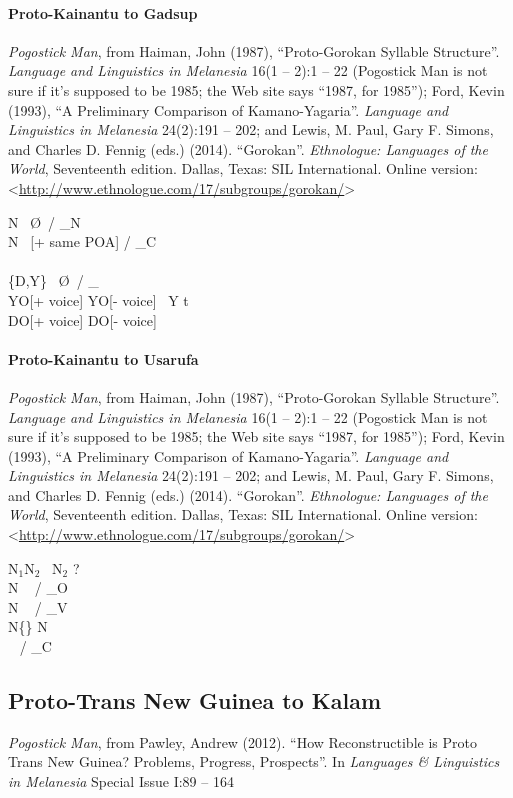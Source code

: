 \documentclass[11pt]{article}
\newcommand{\ipa}{\textipa}
\newcommand{\change}{\textrightarrow}
\begin{document}
\paragraph{Proto-Kainantu to Gadsup}{\it Pogostick Man}, from Haiman, John (1987), ``Proto-Gorokan Syllable Structure''. {\it Language and Linguistics in Melanesia} 16(1 -- 2):1 -- 22 (Pogostick Man is not sure if it's supposed to be 1985; the Web site says ``1987, for 1985''); Ford, Kevin (1993), ``A Preliminary Comparison of Kamano-Yagaria''. {\it Language and Linguistics in Melanesia} 24(2):191 -- 202; and Lewis, M. Paul, Gary F. Simons, and Charles D. Fennig (eds.) (2014). ``Gorokan''. {\it Ethnologue: Languages of the World}, Seventeenth edition. Dallas, Texas: SIL International. Online version: \textless\url{http://www.ethnologue.com/17/subgroups/gorokan/}\textgreater

N \change\ \O\ / _N\\
N \change\ [+ same POA] / _C\\
\ipa{nw nr} \change\ \ipa{mb nd}\\
\{D,Y\} \change\ \O\ / _\ipa{n}\\
YO[+ voice] YO[- voice] \change\ Y t\\
DO[+ voice] DO[- voice] \change\ \ipa{nd nt}

\paragraph{Proto-Kainantu to Usarufa}{\it Pogostick Man}, from Haiman, John (1987), ``Proto-Gorokan Syllable Structure''. {\it Language and Linguistics in Melanesia} 16(1 -- 2):1 -- 22 (Pogostick Man is not sure if it's supposed to be 1985; the Web site says ``1987, for 1985''); Ford, Kevin (1993), ``A Preliminary Comparison of Kamano-Yagaria''. {\it Language and Linguistics in Melanesia} 24(2):191 -- 202; and Lewis, M. Paul, Gary F. Simons, and Charles D. Fennig (eds.) (2014). ``Gorokan''. {\it Ethnologue: Languages of the World}, Seventeenth edition. Dallas, Texas: SIL International. Online version: \textless\url{http://www.ethnologue.com/17/subgroups/gorokan/}\textgreater

N$_1$N$_2$ \change\ N$_2$\ipa{:} ?\\
N \change\ \ipa{P} / _O\\
N \change\ \ipa{n} / _V\\
N\{\ipa{w,r}\} N\ipa{j} \change\ \ipa{Pk Pt}\\
\ipa{r} \change\ \ipa{P} / _C

\subsection{Proto-Trans New Guinea to Kalam}{\it Pogostick Man}, from Pawley, Andrew (2012). ``How Reconstructible is Proto Trans New Guinea? Problems, Progress, Prospects''. In {\it Languages \& Linguistics in Melanesia} Special Issue I:89 -- 164
\end{document}
